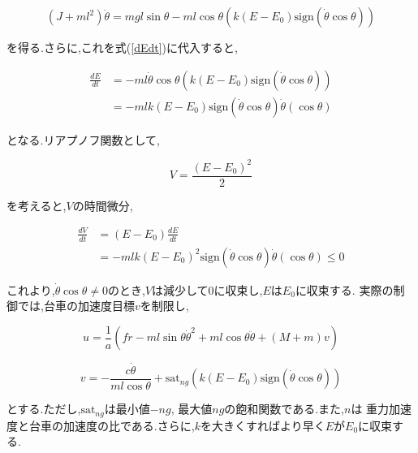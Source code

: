 \begin{equation}
    (J + ml^2) \ddot{\theta} = mgl \sin{\theta}
                - ml \cos{\theta} (k(E - E_{0}) \mbox{sign} (\dot{\theta} \cos{\theta}))    
\end{equation}

を得る.さらに,これを式(\ref{dEdt})に代入すると,

\begin{equation*}
    \begin{split}
        \frac{dE}{dt} &= -ml \dot{\theta} \cos{\theta} (k(E - E_{0}) 
                            \mbox{sign} (\dot{\theta} \cos{\theta})) \\
                      &= -mlk(E - E_{0}) \mbox{sign} (\dot{\theta} \cos{\theta}) \dot{\theta} (\cos{\theta})
    \end{split}
\end{equation*}

となる.リアプノフ関数として,

\begin{equation}
    V = \frac{(E - E_{0})^2}{2}
\end{equation}

を考えると,$V$の時間微分,

\begin{equation}
    \begin{split}
        \frac{dV}{dt} &= (E - E_{0}) \frac{dE}{dt} \\
                      &= -mlk(E - E_{0})^2 \mbox{sign} (\dot{\theta} \cos{\theta}) \dot{\theta} (\cos{\theta}) \leq 0
    \end{split}
\end{equation}

これより,$\dot{\theta} \cos{\theta} \neq 0$のとき,$V$は減少して$0$に収束し,$E$は$E_{0}$に収束する.
実際の制御では,台車の加速度目標$v$を制限し,

$$
    u = \frac{1}{a}
        \left(
            f \dot{r} - ml \sin{\theta} \dot{\theta}^2 + ml \cos{\theta} \ddot{\theta}
            + (M + m)v
        \right)
$$

$$
    v = - \frac{c \dot{\theta}}{ml\cos{\theta}} 
        + \mbox{sat}_{ng} (k(E - E_{0}) \mbox{sign}(\dot{\theta}\cos{\theta}))
$$

とする.ただし,$\mbox{sat}_{ng}$は最小値$-ng$, 最大値$ng$の飽和関数である.また,$n$は
重力加速度と台車の加速度の比である.さらに,$k$を大きくすればより早く$E$が$E_{0}$に収束する.



